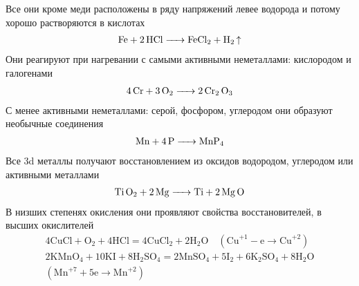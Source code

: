 Все они кроме меди расположены в ряду напряжений левее водорода  и потому хорошо растворяются в кислотах 
\begin{align*}
\ce{Fe  + 2 HCl -> FeCl_2 + H_2 \uparrow}
\end{align*}
Они реагируют при нагревании с самыми активными неметаллами: кислородом и галогенами
\begin{align*}
\ce{4Cr +3O_2 -> 2 Cr_2 O_3}
\end{align*}
С менее активными неметаллами: серой, фосфором, углеродом они образуют необычные соединения
\begin{align*}
\ce{Mn + 4P -> MnP_4}
\end{align*}
Все 3d металлы получают восстановлением из оксидов водородом, углеродом или активными металлами
\begin{align*}
\ce{Ti  O_2 + 2Mg -> Ti + 2Mg O}
\end{align*}
В низших степенях окисления они проявляют свойства восстановителей, в высших окислителей
\begin{align*}
4 \mathrm{CuCl}+\mathrm{O}_{2}+4 \mathrm{HCl}=4 \mathrm{CuCl}_{2}+2 \mathrm{H}_{2} \mathrm{O} \quad\left(\mathrm{Cu}^{+1}-\mathrm{e} \rightarrow \mathrm{Cu}^{+2}\right)\\
2 \mathrm{KMnO}_{4}+10 \mathrm{KI}+8 \mathrm{H}_{2} \mathrm{SO}_{4}=2 \mathrm{MnSO}_{4}+5 \mathrm{I}_{2}+6 \mathrm{K}_{2} \mathrm{SO}_{4}+8 \mathrm{H}_{2} \mathrm{O} \\
\left(\mathrm{Mn}^{+7}+5 \mathrm{e} \rightarrow \mathrm{Mn}^{+2}\right)	
\end{align*}